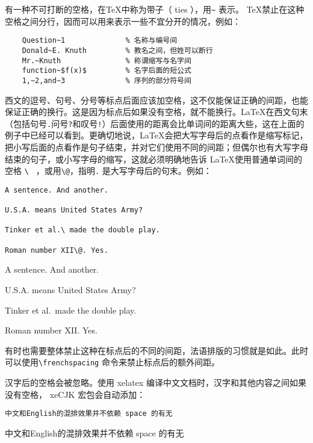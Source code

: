 有一种不可打断的空格，在\TeX 中称为带子（ ties ），用\verb|~| 表示。 \TeX 禁止在这种空格之间分行，因而可以用来表示一些不宜分开的情况，例如：
\begin{lstlisting}
    Question~1              % 名称与编号间
    Donald~E. Knuth         % 教名之间，但姓可以断行
    Mr.~Knuth               % 称谓缩写与名字间
    function~$f(x)$         % 名字后面的短公式
    1,~2,and~3              % 序列的部分符号间
\end{lstlisting}

西文的逗号、句号、分号等标点后面应该加空格，这不仅能保证正确的间距，也能保证正确的换行。这是因为标点后如果没有空格，就不能换行。\LaTeX 在西文句末（包括句号\verb|.|问号\verb|?|和叹号\verb|!|）后面使用的距离会比单词间的距离大些，这在上面的例子中已经可以看到。更确切地说，\LaTeX 会把大写字母后的点看作是缩写标记，把小写后面的点看作是句子结束，并对它们使用不同的间距；但偶尔也有大写字母结束的句子，或小写字母的缩写，这就必须明确地告诉 \LaTeX 使用普通单词间的空格 \lstinline[showspaces=true]{\ } ，或用\verb|\@|，指明\verb|.| 是大写字母后的句末。例如：

\begin{minipage}[t]{0.45\textwidth}
\begin{lstlisting}[showspaces=true]
A sentence. And another.

U.S.A. means United States Army?

Tinker et al.\ made the double play.

Roman number XII\@. Yes.
\end{lstlisting}
\end{minipage}
\hfill
\begin{minipage}[t]{0.45\textwidth}
A sentence. And another.

U.S.A. means United States Army?

Tinker et al.\ made the double play.

Roman number XII\@. Yes.
\end{minipage}
有时也需要整体禁止这种在标点后的不同的间距，法语排版的习惯就是如此。此时可以使用\verb|\frenchspacing| 命令来禁止标点后的额外间距。

汉字后的空格会被忽略。使用 xelatex 编译中文文档时，汉字和其他内容之间如果没有空格， xeCJK 宏包会自动添加：

\begin{minipage}[t]{0.45\textwidth}
\begin{lstlisting}[showspaces=true]
中文和English的混排效果并不依赖 space 的有无 
\end{lstlisting}
\end{minipage}
\hfill
\begin{minipage}[t]{0.45\textwidth}
    中文和English的混排效果并不依赖 space 的有无
\end{minipage}

